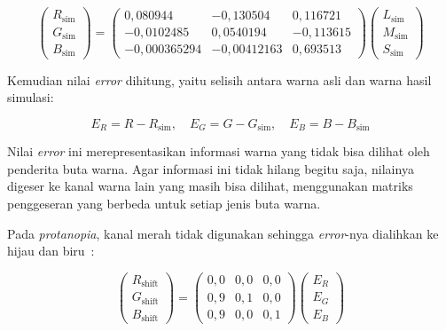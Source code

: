 \begin{equation}
  \begin{pmatrix} R_{\text{sim}} \\ G_{\text{sim}} \\ B_{\text{sim}} \end{pmatrix}
  =
  \begin{pmatrix}
    0{,}080944    & -0{,}130504   &  0{,}116721  \\
    -0{,}0102485  &  0{,}0540194  & -0{,}113615 \\
    -0{,}000365294 & -0{,}00412163 &  0{,}693513
  \end{pmatrix}
  \begin{pmatrix} L_{\text{sim}} \\ M_{\text{sim}} \\ S_{\text{sim}} \end{pmatrix}
  \label{eq:lms-to-rgb}
\end{equation}

Kemudian nilai \textit{error} dihitung, yaitu selisih antara warna asli dan warna hasil simulasi:

\begin{equation}
  E_R = R - R_{\text{sim}}, \quad
  E_G = G - G_{\text{sim}}, \quad
  E_B = B - B_{\text{sim}}
  \label{eq:error}
\end{equation}

Nilai \textit{error} ini merepresentasikan informasi warna yang tidak bisa dilihat oleh penderita buta warna.
Agar informasi ini tidak hilang begitu saja, nilainya digeser ke kanal warna lain yang masih bisa dilihat, menggunakan matriks penggeseran yang berbeda untuk setiap jenis buta warna.

Pada \textit{protanopia}, kanal merah tidak digunakan sehingga \textit{error}-nya dialihkan ke hijau dan biru~\parencite{tasnim2017}:

\begin{equation}
  \begin{pmatrix} R_{\text{shift}} \\ G_{\text{shift}} \\ B_{\text{shift}} \end{pmatrix}
  =
  \begin{pmatrix} 0{,}0 & 0{,}0 & 0{,}0 \\ 0{,}9 & 0{,}1 & 0{,}0 \\ 0{,}9 & 0{,}0 & 0{,}1 \end{pmatrix}
  \begin{pmatrix} E_R \\ E_G \\ E_B \end{pmatrix}
  \label{eq:shift-protanopia}
\end{equation}

